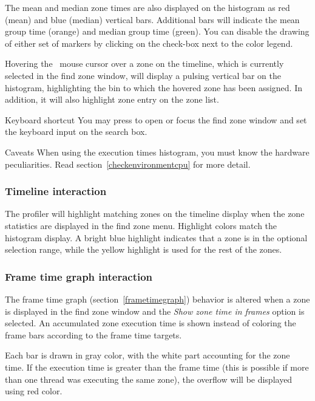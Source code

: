 \documentclass[hidelinks,titlepage,a4paper,twoside]{article}
\begin{document}
The mean and median zone times are also displayed on the histogram as red (mean) and blue (median) vertical bars. Additional bars will indicate the mean group time (orange) and median group time (green). You can disable the drawing of either set of markers by clicking on the check-box next to the color legend.

Hovering the \faArrowPointer{}~mouse cursor over a zone on the timeline, which is currently selected in the find zone window, will display a pulsing vertical bar on the histogram, highlighting the bin to which the hovered zone has been assigned. In addition, it will also highlight zone entry on the zone list.

\begin{bclogo}[
noborder=true,
couleur=black!5,
logo=\bclampe
]{Keyboard shortcut}
You may press  to open or focus the find zone window and set the keyboard input on the search box.
\end{bclogo}

\begin{bclogo}[
noborder=true,
couleur=black!5,
logo=\bcattention
]{Caveats}
When using the execution times histogram, you must know the hardware peculiarities. Read section~\ref{checkenvironmentcpu} for more detail.
\end{bclogo}

\subsubsection{Timeline interaction}

The profiler will highlight matching zones on the timeline display when the zone statistics are displayed in the find zone menu. Highlight colors match the histogram display. A bright blue highlight indicates that a zone is in the optional selection range, while the yellow highlight is used for the rest of the zones.

\subsubsection{Frame time graph interaction}
\label{frametimefindzone}

The frame time graph (section~\ref{frametimegraph}) behavior is altered when a zone is displayed in the find zone window and the \emph{Show zone time in frames} option is selected. An accumulated zone execution time is shown instead of coloring the frame bars according to the frame time targets.

Each bar is drawn in gray color, with the white part accounting for the zone time. If the execution time is greater than the frame time (this is possible if more than one thread was executing the same zone), the overflow will be displayed using red color.
\end{document}
